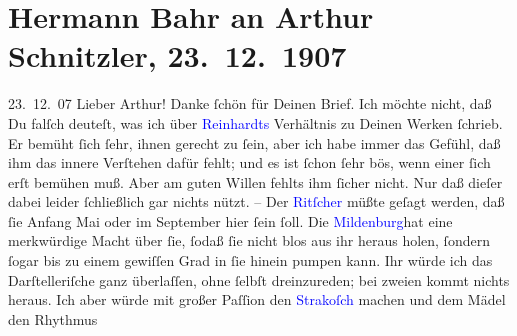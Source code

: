 

               \section[Hermann Bahr an Arthur Schnitzler, 23. 12. 1907]{ Hermann Bahr an Arthur Schnitzler, 23. 12. 1907}\nopagebreak{}\rehead{ }\normalsize\beginnumbering{} \toendnotes[C]{\smallbreak\pagebreak[2]} 
\toendnotes[C]{\smallbreak}\pstart
           \raggedleft{}{\pb}23. 12. 07\pend
           \pstart\center{}Lieber Arthur!\pend\pstart
           Danke ſchön für Deinen Brief. Ich möchte nicht, daß Du falſch deuteſt, was ich über
                  \textcolor{blue}{Reinhardts}{}\ledrightnote{\textcolor{blue}{Max Reinhardt}} Verhältnis zu Deinen Werken
               ſchrieb. Er bemüht ſich ſehr, ihnen gerecht zu ſein, aber ich habe immer das Gefühl,
               daß ihm das innere Verſtehen dafür fehlt; und es ist ſchon ſehr bös, wenn einer ſich
               erſt bemühen muß. Aber am guten Willen fehlts ihm ſicher nicht. Nur daß dieſer dabei
               leider ſchließlich gar nichts nützt. – Der \textcolor{blue}{Ritſcher}{}\ledrightnote{\textcolor{blue}{Helene Ritscher}} müßte geſagt werden, daß ſie Anfang Mai oder im September hier ſein
               ſoll. Die \textcolor{blue}{Mildenburg}{}\ledrightnote{\textcolor{blue}{Anna Bahr-Mildenburg}}{ }{\pb}hat eine merkwürdige Macht über ſie, ſodaß ſie
               nicht blos aus ihr heraus holen, ſondern ſogar bis zu einem gewiſſen Grad in ſie
               hinein pumpen kann. Ihr würde ich das Darſtelleriſche ganz überlaſſen, ohne ſelbſt
               dreinzureden; bei zweien kommt nichts heraus. Ich aber würde mit großer Paſſion den
                  \textcolor{blue}{Strakoſch}{}\ledrightnote{\textcolor{blue}{Alexander Strakosch}} machen und dem Mädel den Rhythmus

